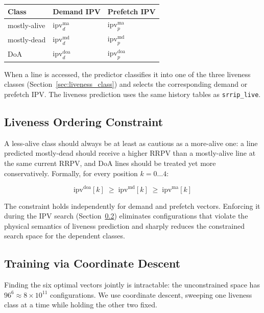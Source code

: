 \documentclass[12pt]{article}
\begin{document}
\begin{center}
\begin{tabular}{lll}
\hline
\textbf{Class} & \textbf{Demand IPV} & \textbf{Prefetch IPV} \\
\hline
mostly-alive & $\text{ipv}^{\text{ma}}_d$ & $\text{ipv}^{\text{ma}}_p$ \\
mostly-dead  & $\text{ipv}^{\text{md}}_d$ & $\text{ipv}^{\text{md}}_p$ \\
DoA          & $\text{ipv}^{\text{doa}}_d$ & $\text{ipv}^{\text{doa}}_p$ \\
\hline
\end{tabular}
\end{center}

When a line is accessed, the predictor classifies it into one of the three
liveness classes (Section~\ref{sec:liveness_class}) and selects the
corresponding demand or prefetch IPV.  The liveness prediction uses the same
history tables as \texttt{srrip\_live}.

\subsection{Liveness Ordering Constraint}
\label{sec:pacipv_constraint}

A less-alive class should always be at least as cautious as a more-alive one:
a line predicted mostly-dead should receive a higher RRPV than a mostly-alive
line at the same current RRPV, and DoA lines should be treated yet more
conservatively.  Formally, for every position $k=0\ldots4$:

\begin{equation}
  \text{ipv}^{\text{doa}}[k] \;\ge\;
  \text{ipv}^{\text{md}}[k]  \;\ge\;
  \text{ipv}^{\text{ma}}[k]
  \label{eq:ordering}
\end{equation}

The constraint holds independently for demand and prefetch vectors.  Enforcing
it during the IPV search (Section~\ref{sec:pacipv_training}) eliminates
configurations that violate the physical semantics of liveness prediction and
sharply reduces the constrained search space for the dependent classes.

\subsection{Training via Coordinate Descent}
\label{sec:pacipv_training}

Finding the six optimal vectors jointly is intractable: the unconstrained space
has $96^6 \approx 8\times10^{11}$ configurations.  We use coordinate descent,
sweeping one liveness class at a time while holding the other two fixed.
\end{document}
